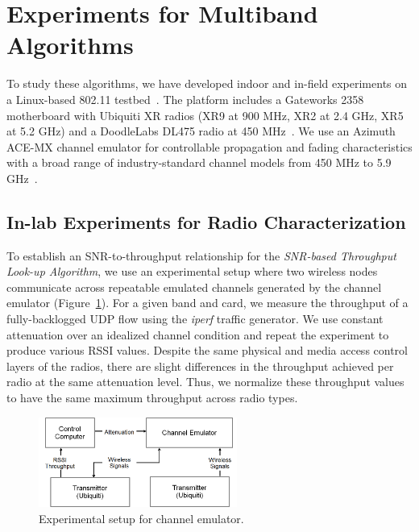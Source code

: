 \section{Experiments for Multiband Algorithms}
\label{sec:vncexperimentdesign}

To study these algorithms, we have developed indoor 
and in-field experiments on 
a Linux-based 802.11 testbed~\cite{Openwrt}. The platform includes a 
Gateworks 2358 motherboard with Ubiquiti XR radios (XR9 at 900 MHz, 
XR2 at 2.4 GHz, XR5 at 5.2 GHz) and a DoodleLabs DL475 radio at 
450 MHz~\cite{Gateworks,Ubnt}.  We use 
an Azimuth ACE-MX channel emulator for
controllable propagation and fading characteristics with a broad range of 
industry-standard channel models from 450 MHz to 5.9 GHz~\cite{AzimuthACE}. 

\subsection{In-lab Experiments for Radio Characterization}
\label{subsec:ichannel}
To establish an SNR-to-throughput relationship for the \emph{SNR-based 
Throughput Look-up Algorithm}, we use an experimental setup where two 
wireless nodes communicate across repeatable emulated channels generated 
by the channel emulator (Figure~\ref{fig:in-door experiment}). For a given band and card, we measure
the throughput of a fully-backlogged UDP flow using the {\it iperf} 
traffic generator. We use constant attenuation over an idealized
channel condition and repeat the experiment to
produce various RSSI values.
Despite the same physical and media access control layers of the radios, there are
slight differences in the throughput achieved per radio at the same attenuation
level.  Thus, we normalize these throughput values to have the same maximum
throughput across radio types.

\begin{figure} [h]
\centering
\includegraphics[width=65mm]{figures/emulator2}
\caption{Experimental setup for channel emulator.}
\label{fig:in-door experiment}
\vspace{-0.1in}
\end{figure}

